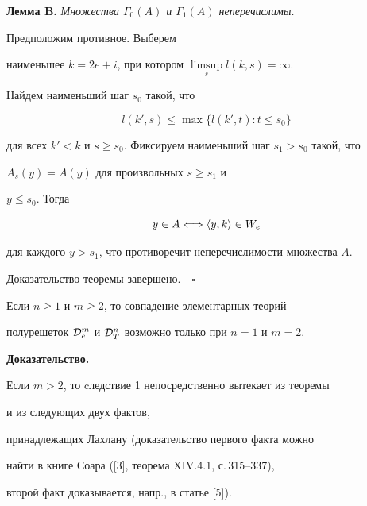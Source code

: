 {\bf Лемма B.} {\it Множества $\Gamma_0(A)$ и $\Gamma_1(A)$ неперечислимы.}





\begin{pf}


Предположим противное. Выберем 


наименьшее $k=2e+i$, при котором $\limsup\limits_s l(k,s)=\infty$.


Найдем наименьший шаг $s_0$ такой, что 


$$


l(k',s)\le\max\{l(k',t): t\le s_0\}


$$


для всех $k'<k$ и $s\ge s_0$. Фиксируем наименьший шаг $s_1>s_0$ такой, что


$A_s(y)=A(y)$ для произвольных $s\ge s_1$ и 


$y\le s_0$. Тогда


$$


y\in A\Longleftrightarrow \aq{y,k}\in W_e


$$


для каждого $y>s_1$, что противоречит неперечислимости множества $A$.


\end{pf}





Доказательство теоремы завершено.$\quad\square$








\begin{cor}


Если $n\ge 1$ и $m\ge 2$, то совпадение элементарных теорий


полурешеток ${\cal D}_e^{m}$ и ${\cal D}_T^{n}$ возможно только при $n=1$ и $m=2$.


\end{cor}





{\bf Доказательство.}


Если $m>2$, то cледствие 1 непосредственно вытекает из теоремы


и из следующих двух фактов,


принадлежащих Лахлану (доказательство первого факта можно 


найти в книге Соара ([3], теорема XIV.4.1, с.\,315--337),


второй факт доказывается, напр., в статье [5]).



